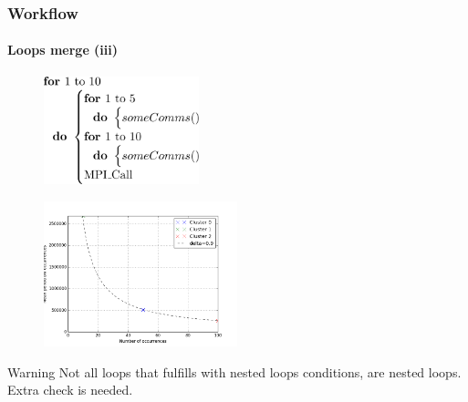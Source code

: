\documentclass{beamer}
\begin{document}
\begin{frame}
\frametitle{Workflow}
\framesubtitle{Loops merge (iii)}
\begin{multicols}{2}
	\begin{figure}
		\includegraphics[width=0.4\textwidth]{imgs/delta_clustering_test_2_pse.png}
	\end{figure}
	\pause
	\columnbreak
	\begin{figure}
		\includegraphics[width=0.5\textwidth]{imgs/delta_clustering_test_2.png}
	\end{figure}
\end{multicols}
\pause
\begin{block}{Warning}
	Not all loops that fulfills with nested loops conditions, are nested loops.\\
	Extra check is needed.
\end{block}
\end{frame}
\end{document}

